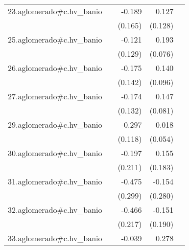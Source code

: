 {\begin{longtable}{l*{4}{D{.}{.}{-1}}}
\addlinespace
23.aglomerado#c.hv\_banio&                     &      -0.189         &       0.127         &                     \\
            &                     &     (0.165)         &     (0.128)         &                     \\
\addlinespace
25.aglomerado#c.hv\_banio&                     &      -0.121         &       0.193\sym{*}  &                     \\
            &                     &     (0.129)         &     (0.076)         &                     \\
\addlinespace
26.aglomerado#c.hv\_banio&                     &      -0.175         &       0.140         &                     \\
            &                     &     (0.142)         &     (0.096)         &                     \\
\addlinespace
27.aglomerado#c.hv\_banio&                     &      -0.174         &       0.147         &                     \\
            &                     &     (0.132)         &     (0.081)         &                     \\
\addlinespace
29.aglomerado#c.hv\_banio&                     &      -0.297\sym{*}  &       0.018         &                     \\
            &                     &     (0.118)         &     (0.054)         &                     \\
\addlinespace
30.aglomerado#c.hv\_banio&                     &      -0.197         &       0.155         &                     \\
            &                     &     (0.211)         &     (0.183)         &                     \\
\addlinespace
31.aglomerado#c.hv\_banio&                     &      -0.475         &      -0.154         &                     \\
            &                     &     (0.299)         &     (0.280)         &                     \\
\addlinespace
32.aglomerado#c.hv\_banio&                     &      -0.466\sym{*}  &      -0.151         &                     \\
            &                     &     (0.217)         &     (0.190)         &                     \\
\addlinespace
33.aglomerado#c.hv\_banio&                     &      -0.039         &       0.278\sym{***}&                     \\

\end{longtable}}
